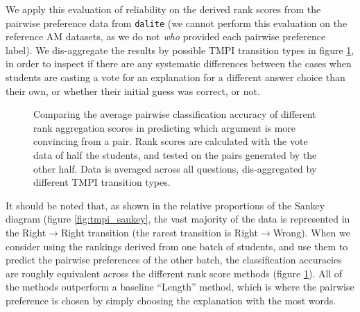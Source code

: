 \documentclass[notitlepage,12pt]{jedm}
\begin{document}
We apply this evaluation of reliability on the derived rank scores from the 
pairwise preference data from \verb|dalite| (we cannot perform this evaluation 
on the reference AM datasets, as we do not \textit{who} provided each pairwise 
preference label). 
We dis-aggregate the results by possible TMPI transition types in figure 
\ref{fig:acc_by_batch}, in order to inspect if there are any systematic 
differences between the cases when students are casting 
a vote for an explanation for a different answer choice than their own, or 
whether their initial guess was correct, or not.

\begin{figure}[H]
	\centering
	\scalebox{0.6}{}
	\caption{
		Comparing the average pairwise classification accuracy of different 
		rank aggregation scores in predicting which argument is more convincing 
		from a pair. 
		Rank scores are calculated with the vote data of half the students, and 
		tested on the pairs generated by the other half. 
		Data is averaged across all questions, dis-aggregated by different TMPI 
		transition types. 
	}
	\label{fig:acc_by_batch}
\end{figure}

It should be noted that, as shown in the relative proportions of the Sankey 
diagram (figure \ref{fig:tmpi_sankey}, the vast majority of the data is 
represented in the Right$\rightarrow$Right transition (the rarest transition is 
Right$\rightarrow$Wrong).
When we consider using the rankings derived from one batch of students, and use 
them to predict the pairwise preferences of the other batch, the classification 
accuracies are roughly equivalent across the different rank score methods 
(figure \ref{fig:acc_by_batch}).
All of the methods outperform a baseline ``Length'' method, which is where the 
pairwise preference is chosen by simply choosing the explanation with the most 
words.

%
%
\end{document}
